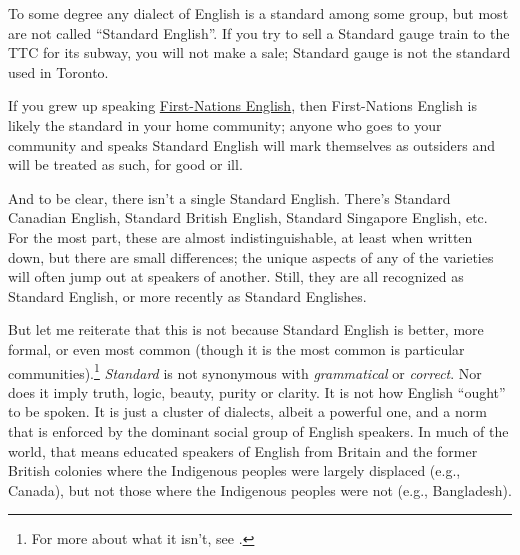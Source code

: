 To some degree any dialect of English is a standard among some group, but most are not called ``Standard English''. If you try to sell a Standard gauge train to the TTC for its subway, you will not make a sale; Standard gauge is not the standard used in Toronto.

If you grew up speaking \href{https://en.wikipedia.org/wiki/Indigenous_English_in_Canada}{First-Nations English}, then First-Nations English is likely the standard in your home community; anyone who goes to your community and speaks Standard English will mark themselves as outsiders and will be treated as such, for good or ill.

And to be clear, there isn't a single Standard English. There's Standard Canadian English, Standard British English, Standard Singapore English, etc. For the most part, these are almost indistinguishable, at least when written down, but there are small differences; the unique aspects of any of the varieties will often jump out at speakers of another. Still, they are all recognized as Standard English, or more recently as Standard Englishes.

But let me reiterate that this is not because Standard English is better, more formal, or even most common (though it is the most common is particular communities).\footnote{For more about what it isn't, see \citet{trudgill99}.} \textit{Standard} is not synonymous with \textit{grammatical} or \textit{correct}. Nor does it imply truth, logic, beauty, purity or clarity. It is not how English ``ought'' to be spoken. It is just a cluster of dialects, albeit a powerful one, and a norm that is enforced by the dominant social group of English speakers. In much of the world, that means educated speakers of English from Britain and the former British colonies where the Indigenous peoples were largely displaced (e.g., Canada), but not those where the Indigenous peoples were not (e.g., Bangladesh).


